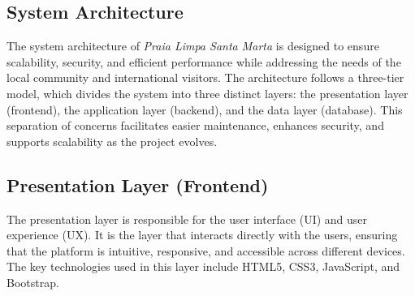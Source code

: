 \subsection{System Architecture}

The system architecture of \textit{Praia Limpa Santa Marta} is designed to ensure scalability, security, and efficient performance while addressing the needs of the local community and international visitors. The architecture follows a three-tier model, which divides the system into three distinct layers: the presentation layer (frontend), the application layer (backend), and the data layer (database). This separation of concerns facilitates easier maintenance, enhances security, and supports scalability as the project evolves.

\subsection{Presentation Layer (Frontend)}

The presentation layer is responsible for the user interface (UI) and user experience (UX). It is the layer that interacts directly with the users, ensuring that the platform is intuitive, responsive, and accessible across different devices. The key technologies used in this layer include HTML5, CSS3, JavaScript, and Bootstrap.

